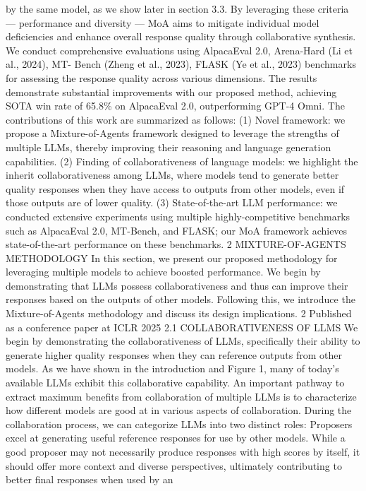 by the same model, as we show later in section 3.3. By leveraging these criteria — performance and
diversity — MoA aims to mitigate individual model deficiencies and enhance overall response quality
through collaborative synthesis.
We conduct comprehensive evaluations using AlpacaEval 2.0, Arena-Hard (Li et al., 2024), MT-
Bench (Zheng et al., 2023), FLASK (Ye et al., 2023) benchmarks for assessing the response quality
across various dimensions. The results demonstrate substantial improvements with our proposed
method, achieving SOTA win rate of 65.8\% on AlpacaEval 2.0, outperforming GPT-4 Omni.
The contributions of this work are summarized as follows: (1) Novel framework: we propose
a Mixture-of-Agents framework designed to leverage the strengths of multiple LLMs, thereby
improving their reasoning and language generation capabilities. (2) Finding of collaborativeness
of language models: we highlight the inherit collaborativeness among LLMs, where models tend
to generate better quality responses when they have access to outputs from other models, even if
those outputs are of lower quality. (3) State-of-the-art LLM performance: we conducted extensive
experiments using multiple highly-competitive benchmarks such as AlpacaEval 2.0, MT-Bench, and
FLASK; our MoA framework achieves state-of-the-art performance on these benchmarks.
2
MIXTURE-OF-AGENTS METHODOLOGY
In this section, we present our proposed methodology for leveraging multiple models to achieve
boosted performance. We begin by demonstrating that LLMs possess collaborativeness and thus
can improve their responses based on the outputs of other models. Following this, we introduce the
Mixture-of-Agents methodology and discuss its design implications.
2
Published as a conference paper at ICLR 2025
2.1
COLLABORATIVENESS OF LLMS
We begin by demonstrating the collaborativeness of LLMs, specifically their ability to generate higher
quality responses when they can reference outputs from other models. As we have shown in the
introduction and Figure 1, many of today’s available LLMs exhibit this collaborative capability.
An important pathway to extract maximum benefits from collaboration of multiple LLMs is to
characterize how different models are good at in various aspects of collaboration. During the
collaboration process, we can categorize LLMs into two distinct roles:
Proposers excel at generating useful reference responses for use by other models. While a good
proposer may not necessarily produce responses with high scores by itself, it should offer more
context and diverse perspectives, ultimately contributing to better final responses when used by an
